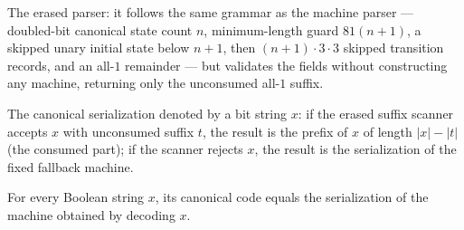 \begin{definition}
\label{Turing.codeScan}
\leanok
{}
The erased parser: it follows the same grammar as the machine parser ---
doubled-bit canonical state count $n$, minimum-length guard $81(n+1)$, a
skipped unary initial state below $n + 1$, then $(n+1) \cdot 3 \cdot 3$ skipped
transition records, and an all-$1$ remainder --- but validates the fields
without constructing any machine, returning only the unconsumed all-$1$
suffix.
\end{definition}

\begin{definition}
\label{Turing.codeCanonical}
\leanok
{}
The canonical serialization denoted by a bit string $x$: if the erased suffix
scanner accepts $x$ with unconsumed suffix $t$, the result is the prefix of $x$
of length $|x| - |t|$ (the consumed part); if the scanner rejects $x$, the
result is the serialization of the fixed fallback machine.
\end{definition}

\begin{lemma}
\label{Turing.codeCanonical_eq}
\leanok
{}
For every Boolean string $x$, its canonical code equals the serialization of the machine
obtained by decoding $x$.
\end{lemma}
